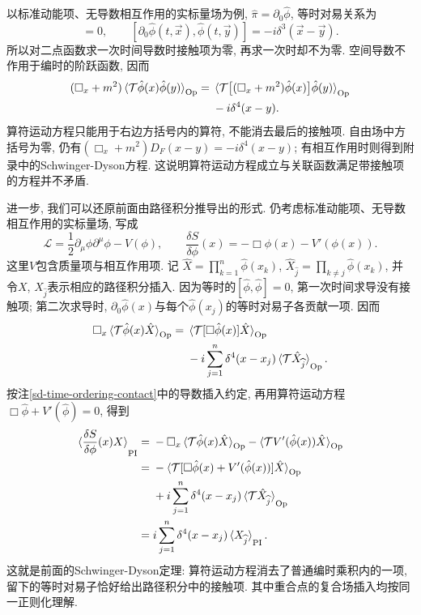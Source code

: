 {以标准动能项、无导数相互作用的实标量场为例, $\hat\pi=\partial_0\hat\phi$, 等时对易关系为
\begin{equation}
    [\hat\phi(t,\vec x),\hat\phi(t,\vec y)]=0,
    \qquad [\partial_0\hat\phi(t,\vec x),\hat\phi(t,\vec y)]=-i\delta^3(\vec x-\vec y).
\end{equation}
所以对二点函数求一次时间导数时接触项为零, 再求一次时却不为零. 空间导数不作用于编时的阶跃函数, 因而
\begin{align}
    (\Box_x+m^2)\braket{\mathcal T\hat\phi(x)\hat\phi(y)}_{\mathrm{Op}}
    ={}&\braket{\mathcal T\big[(\Box_x+m^2)\hat\phi(x)\big]\hat\phi(y)}_{\mathrm{Op}}\notag\\
    &-i\delta^4(x-y).
\end{align}
算符运动方程只能用于右边方括号内的算符, 不能消去最后的接触项. 自由场中方括号为零, 仍有$(\Box_x+m^2)D_F(x-y)=-i\delta^4(x-y)$; 有相互作用时则得到附录中的Schwinger-Dyson方程. 这说明算符运动方程成立与关联函数满足带接触项的方程并不矛盾.

进一步, 我们可以还原前面由路径积分推导出的形式. 仍考虑标准动能项、无导数相互作用的实标量场, 写成
\begin{equation}
    \mathcal L=\frac12\partial_\mu\phi\partial^\mu\phi-V(\phi),
    \qquad \frac{\delta S}{\delta\phi}(x)=-\Box\phi(x)-V'(\phi(x)).
\end{equation}
这里$V$包含质量项与相互作用项. 记
$\hat X=\prod_{k=1}^n\hat\phi(x_k)$,
$\hat X_{\widehat j}=\prod_{k\ne j}\hat\phi(x_k)$,
并令$X$, $X_{\widehat j}$表示相应的路径积分插入. 因为等时的$[\hat\phi,\hat\phi]=0$, 第一次时间求导没有接触项; 第二次求导时, $\partial_0\hat\phi(x)$与每个$\hat\phi(x_j)$的等时对易子各贡献一项. 因而
\begin{align}
    \Box_x\braket{\mathcal T\hat\phi(x)\hat X}_{\mathrm{Op}}
    ={}&\braket{\mathcal T[\Box\hat\phi(x)]\hat X}_{\mathrm{Op}}\notag\\
    &-i\sum_{j=1}^n\delta^4(x-x_j)
    \braket{\mathcal T\hat X_{\widehat j}}_{\mathrm{Op}}.
\end{align}
按注\ref{sd-time-ordering-contact}中的导数插入约定, 再用算符运动方程$\Box\hat\phi+V'(\hat\phi)=0$, 得到
\begin{align}
    \braket{\frac{\delta S}{\delta\phi}(x)X}_{\mathrm{PI}}
    ={}&-\Box_x\braket{\mathcal T\hat\phi(x)\hat X}_{\mathrm{Op}}
    -\braket{\mathcal T V'(\hat\phi(x))\hat X}_{\mathrm{Op}}\notag\\
    ={}&-\braket{\mathcal T[\Box\hat\phi(x)+V'(\hat\phi(x))]\hat X}_{\mathrm{Op}}\notag\\
    &+i\sum_{j=1}^n\delta^4(x-x_j)
    \braket{\mathcal T\hat X_{\widehat j}}_{\mathrm{Op}}\notag\\
    ={}&i\sum_{j=1}^n\delta^4(x-x_j)
    \braket{X_{\widehat j}}_{\mathrm{PI}}.
    \label{sd-from-equal-time-commutators}
\end{align}
这就是前面的Schwinger-Dyson定理: 算符运动方程消去了普通编时乘积内的一项, 留下的等时对易子恰好给出路径积分中的接触项. 其中重合点的复合场插入均按同一正则化理解.
}

